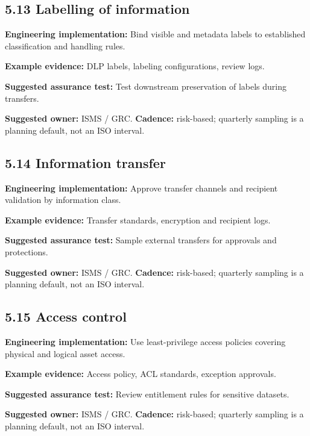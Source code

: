 \documentclass[11pt,letterpaper]{article}
\begin{document}
\subsection{5.13 Labelling of information}
\textbf{Engineering implementation:} Bind visible and metadata labels to established classification and handling rules.\par
\textbf{Example evidence:} DLP labels, labeling configurations, review logs.\par
\textbf{Suggested assurance test:} Test downstream preservation of labels during transfers.\par
\textbf{Suggested owner:} ISMS / GRC. \textbf{Cadence:} risk-based; quarterly sampling is a planning default, not an ISO interval.\par
{}
\subsection{5.14 Information transfer}
\textbf{Engineering implementation:} Approve transfer channels and recipient validation by information class.\par
\textbf{Example evidence:} Transfer standards, encryption and recipient logs.\par
\textbf{Suggested assurance test:} Sample external transfers for approvals and protections.\par
\textbf{Suggested owner:} ISMS / GRC. \textbf{Cadence:} risk-based; quarterly sampling is a planning default, not an ISO interval.\par
{}
\subsection{5.15 Access control}
\textbf{Engineering implementation:} Use least-privilege access policies covering physical and logical asset access.\par
\textbf{Example evidence:} Access policy, ACL standards, exception approvals.\par
\textbf{Suggested assurance test:} Review entitlement rules for sensitive datasets.\par
\textbf{Suggested owner:} ISMS / GRC. \textbf{Cadence:} risk-based; quarterly sampling is a planning default, not an ISO interval.\par
{}
\end{document}
